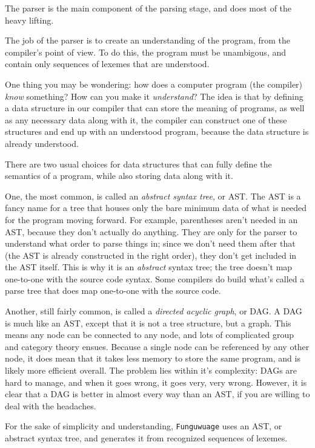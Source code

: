 \documentclass[12pt]{report}
\newcommand{\langname}{Funguwuage}
\newcommand{\lang}{\texttt{\langname} }
\begin{document}
The parser is the main component of the parsing stage, and does most of the heavy lifting.

The job of the parser is to create an understanding of the program, from the compiler's point of view. To do this, the program must be unambigous, and contain only sequences of lexemes that are understood.

One thing you may be wondering: how does a computer program (the compiler) \emph{know} something? How can you make it \emph{understand}? The idea is that by defining a data structure in our compiler that can store the meaning of programs, as well as any necessary data along with it, the compiler can construct one of these structures and end up with an understood program, because the data structure is already understood.

There are two usual choices for data structures that can fully define the semantics of a program, while also storing data along with it.

One, the most common, is called an \emph{abstract syntax tree}, or AST. The AST is a fancy name for a tree that houses only the bare minimum data of what is needed for the program moving forward. For example, parentheses aren't needed in an AST, because they don't actually do anything. They are only for the parser to understand what order to parse things in; since we don't need them after that (the AST is already constructed in the right order), they don't get included in the AST itself. This is why it is an \emph{abstract} syntax tree; the tree doesn't map one-to-one with the source code syntax. Some compilers do build what's called a parse tree that does map one-to-one with the source code.

Another, still fairly common, is called a \emph{directed acyclic graph}, or DAG. A DAG is much like an AST, except that it is not a tree structure, but a graph. This means any node can be connected to any node, and lots of complicated group and category theory ensues. Because a single node can be referenced by any other node, it does mean that it takes less memory to store the same program, and is likely more efficient overall. The problem lies within it's complexity: DAGs are hard to manage, and when it goes wrong, it goes very, very wrong. However, it is clear that a DAG is better in almost every way than an AST, if you are willing to deal with the headaches.

For the sake of simplicity and understanding, \lang uses an AST, or abstract syntax tree, and generates it from recognized sequences of lexemes.
\end{document}
